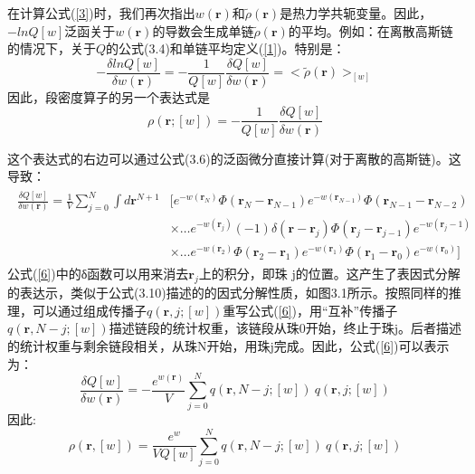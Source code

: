 在计算公式(\ref{3})时，我们再次指出$w(\mathbf{r})$和$\tilde{\rho}(\mathbf{r})$是热力学共轭变量。因此，$-lnQ[w]$泛函关于$w(\mathbf{r})$的导数会生成单链$\tilde{\rho}(\mathbf{r})$的平均。例如：在离散高斯链的情况下，关于$Q$的公式(3.4)和单链平均定义(\ref{1})。特别是：
\begin{equation}\label{4}
-\frac{\delta lnQ[w]}{\delta w(\mathbf{r})}=-\frac{1}{Q[w]}\frac{\delta Q[w]}{\delta w(\mathbf{r})}=<\tilde{\rho}(\mathbf{r})>_{[w]}
\end{equation}
因此，段密度算子的另一个表达式是
\begin{equation}\label{5}
\rho(\mathbf{r};[w])=-\frac{1}{Q[w]}\frac{\delta Q[w]}{\delta w(\mathbf{r})}
\end{equation}

这个表达式的右边可以通过公式(3.6)的泛函微分直接计算(对于离散的高斯链)。这导致：
\begin{align}\label{6}
\begin{split}
\frac{\delta Q[w]}{\delta w(\mathbf{r})}=\frac{1}{V}\sum_{j=0}^{N}\int d\mathbf{r}^{N+1}&[e^{-w(\mathbf{r}_{N})}\Phi(\mathbf{r}_{N}-\mathbf{r}_{N-1})e^{-w(\mathbf{r}_{N-1})}\Phi(\mathbf{r}_{N-1}-\mathbf{r}_{N-2}) \\ &\times \ldots e^{-w(\mathbf{r}_{j})}(-1)\delta(\mathbf{r}-\mathbf{r}_j)\Phi(\mathbf{r}_j-\mathbf{r}_{j-1})e^{-w(\mathbf{r}_j-1)}\\ & \times \ldots e^{-w(\mathbf{r}_{2})}\Phi(\mathbf{r}_{2}-\mathbf{r}_{1})e^{-w(\mathbf{r}_{1})}\Phi(\mathbf{r}_{1}-\mathbf{r}_{0})e^{-w(\mathbf{r}_{0})}]
\end{split}
\end{align}
公式(\ref{6})中的δ函数可以用来消去$\mathbf{r}_{j}$上的积分，即珠 j的位置。这产生了表因式分解的表达示，类似于公式(3.10)描述的的因式分解性质，如图3.1所示。按照同样的推理，可以通过组成传播子$q(\mathbf{r},j;[w])$重写公式(\ref{6})，用“互补”传播子$q(\mathbf{r},N-j;[w])$描述链段的统计权重，该链段从珠0开始，终止于珠j。后者描述的统计权重与剩余链段相关，从珠N开始，用珠j完成。因此，公式(\ref{6})可以表示为：
\begin{equation}\label{7}
\frac{\delta Q[w]}{\delta w(\mathbf{\mathbf{\mathbf{r}}})}=-\frac{e^{w(\mathbf{r})}}{V}\sum_{j=0}^{N}q(\mathbf{r},N-j;[w])~q(\mathbf{r},j;[w])
\end{equation}
因此:	
\begin{equation}\label{8}
\rho(\mathbf{r},[w])=\frac{e^{w}}{VQ[w]}\sum_{j=0}^{N}q(\mathbf{r},N-j;[w])~q(\mathbf{r},j;[w])
\end{equation}

